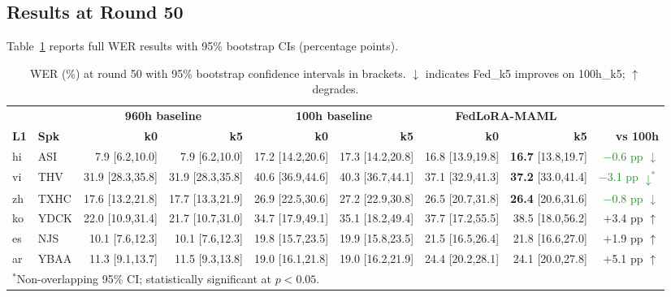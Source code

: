\documentclass[12pt]{article}
\theoremstyle{plain}
\begin{document}
\subsection{Results at Round 50}

Table~\ref{tab:wer} reports full WER results with 95\% bootstrap CIs
(percentage points).

\begin{table}[H]
\centering
\caption{WER (\%) at round 50 with 95\% bootstrap confidence intervals in brackets.
         $\downarrow$ indicates Fed\_k5 improves on 100h\_k5; $\uparrow$ degrades.}
\label{tab:wer}
\setlength{\tabcolsep}{4pt}
\begin{tabular}{ll rr rr rr r}
\toprule
& &
\multicolumn{2}{c}{\textbf{960h baseline}} &
\multicolumn{2}{c}{\textbf{100h baseline}} &
\multicolumn{2}{c}{\textbf{FedLoRA-MAML}} & \\
\cmidrule(lr){3-4}\cmidrule(lr){5-6}\cmidrule(lr){7-8}
\textbf{L1} & \textbf{Spk} &
  \textbf{k0} & \textbf{k5} &
  \textbf{k0} & \textbf{k5} &
  \textbf{k0} & \textbf{k5} &
  \textbf{vs 100h} \\
\midrule
hi & ASI &
  7.9 {\tiny[6.2,10.0]}  & 7.9 {\tiny[6.2,10.0]} &
  17.2 {\tiny[14.2,20.6]} & 17.3 {\tiny[14.2,20.8]} &
  16.8 {\tiny[13.9,19.8]} & \textbf{16.7} {\tiny[13.8,19.7]} &
  \textcolor{ForestGreen}{$-$0.6 pp $\downarrow$} \\
vi & THV &
  31.9 {\tiny[28.3,35.8]} & 31.9 {\tiny[28.3,35.8]} &
  40.6 {\tiny[36.9,44.6]} & 40.3 {\tiny[36.7,44.1]} &
  37.1 {\tiny[32.9,41.3]} & \textbf{37.2} {\tiny[33.0,41.4]} &
  \textcolor{ForestGreen}{$-$3.1 pp $\downarrow^{*}$} \\
zh & TXHC &
  17.6 {\tiny[13.2,21.8]} & 17.7 {\tiny[13.3,21.9]} &
  26.9 {\tiny[22.5,30.6]} & 27.2 {\tiny[22.9,30.8]} &
  26.5 {\tiny[20.7,31.8]} & \textbf{26.4} {\tiny[20.6,31.6]} &
  \textcolor{ForestGreen}{$-$0.8 pp $\downarrow$} \\
ko & YDCK &
  22.0 {\tiny[10.9,31.4]} & 21.7 {\tiny[10.7,31.0]} &
  34.7 {\tiny[17.9,49.1]} & 35.1 {\tiny[18.2,49.4]} &
  37.7 {\tiny[17.2,55.5]} & 38.5 {\tiny[18.0,56.2]} &
  \textcolor{BrickRed}{$+$3.4 pp $\uparrow$} \\
es & NJS &
  10.1 {\tiny[7.6,12.3]}  & 10.1 {\tiny[7.6,12.3]} &
  19.8 {\tiny[15.7,23.5]} & 19.9 {\tiny[15.8,23.5]} &
  21.5 {\tiny[16.5,26.4]} & 21.8 {\tiny[16.6,27.0]} &
  \textcolor{BrickRed}{$+$1.9 pp $\uparrow$} \\
ar & YBAA &
  11.3 {\tiny[9.1,13.7]}  & 11.5 {\tiny[9.3,13.8]} &
  19.0 {\tiny[16.1,21.8]} & 19.0 {\tiny[16.2,21.9]} &
  24.4 {\tiny[20.2,28.1]} & 24.1 {\tiny[20.0,27.8]} &
  \textcolor{BrickRed}{$+$5.1 pp $\uparrow$} \\
\bottomrule
\multicolumn{9}{l}{\footnotesize $^*$Non-overlapping 95\% CI; statistically
significant at $p < 0.05$.}
\end{tabular}
\end{table}
\end{document}
